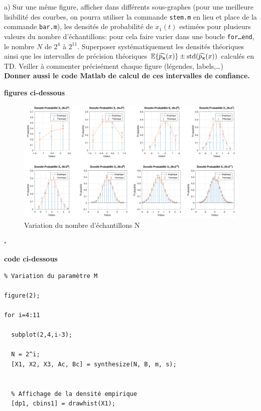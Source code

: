\documentclass{article}
\newcommand{\debutrep}[1]{\color{blue}\begin{center} \hrulefill \textbf{ #1 } \hrulefill \end{center} }
\newcommand{\finrep}{\vspace*{5mm}\hfill $\square$\color{black}\vspace*{5mm}}
\begin{document}
\begin{list}{}{\setlength{\leftmargin}{6mm} \setlength{\labelwidth}{20mm} \setlength{\labelsep}{2mm} \setlength{\itemsep}{1mm} }

\item[a)] Sur une même figure, afficher dans différents sous-graphes (pour une meilleure lisibilité des courbes, on pourra utiliser la commande {\tt stem.m} en lieu et place de la commande {\tt bar.m}), les densités de probabilité de $x_1(t)$ estimées pour plusieurs valeurs du nombre d'échantillons: pour cela faire varier dans une boucle {\tt for\ldots end}, le nombre $N$ de $2^4$ à $2^{11}$. Superposer systématiquement  les densités théoriques ainsi que les intervalles de précision théoriques $\mathbb{E}\{\widehat{p_{\mathbf{x}}}(x)\} \pm {\rm std}(\widehat{p_{\mathbf{x}}}(x))$ calculés en TD. Veiller à  commenter précisément chaque figure (légendes, labels,\ldots)\\
\textbf{Donner aussi le code Matlab de calcul de ces intervalles de confiance.} 


\debutrep{figures ci-dessous}
\begin{figure} [H]
    \centering
    \includegraphics[width=1.15\columnwidth]{Nvar.png}
    \caption{Variation du nombre d'échantillons N}
\end{figure}

\finrep

\newpage
\debutrep{code ci-dessous}
\begin{verbatim}
% Variation du paramètre M

figure(2);

for i=4:11
  
  subplot(2,4,i-3);
  
  N = 2^i;
  [X1, X2, X3, Ac, Bc] = synthesize(N, B, m, s);
  
  
  % Affichage de la densité empirique
  [dp1, cbins1] = drawhist(X1);
  

\end{verbatim}
\end{list}
\end{document}
